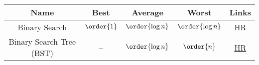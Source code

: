 \begin{tabular}{c c c c c}
\hline
Name & Best & Average & Worst & Links \\
\hline
\hline
Binary Search & $\order{1}$ & $\order{\log{n}}$ & $\order{\log{n}}$ & \href{https://youtu.be/P3YID7liBu}{HR} \\
Binary Search Tree (BST) & -- & $\order{\log{n}}$ & $\order{n}$ & \href{https://youtu.be/oSWTXtMglKE}{HR} \\
\hline
\end{tabular}
